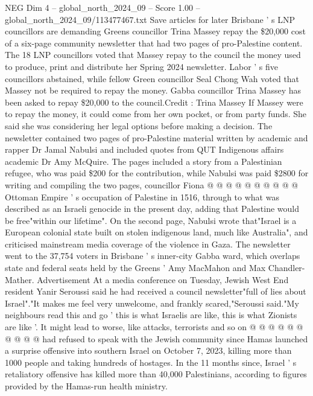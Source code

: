 \begin{textsample}{NEG Dim 4 – global\_north\_2024\_09 – Score 1.00 – global\_north\_2024\_09/113477467.txt}  \label{ex:f4_neg_146}
Save articles for later Brisbane ' s LNP councillors are demanding Greens councillor Trina Massey repay the \$20,000 cost of a six-page community newsletter that had two pages of pro-Palestine content.
The 18 LNP councillors voted that Massey repay to the council the money used to produce, print and distribute her Spring 2024 newsletter.
Labor ' s five councillors abstained, while fellow Green councillor Seal Chong Wah voted that Massey not be required to repay the money.
Gabba councillor Trina Massey has been asked to repay \$20,000 to the council.Credit : Trina Massey If Massey were to repay the money, it could come from her own pocket, or from party funds.
She said she was considering her legal options before making a decision.
The newsletter contained two pages of pro-Palestine material written by academic and rapper Dr Jamal Nabulsi and included quotes from QUT Indigenous affairs academic Dr Amy McQuire.
The pages included a story from a Palestinian refugee, who was paid \$200 for the contribution, while Nabulsi was paid \$2800 for writing and compiling the two pages, councillor Fiona @ @ @ @ @ @ @ @ @ @ Ottoman Empire ' s occupation of Palestine in 1516, through to what was described as an Israeli genocide in the present day, adding that Palestine would be free"within our lifetime".
On the second page, Nabulsi wrote that"Israel is a European colonial state built on stolen indigenous land, much like Australia", and criticised mainstream media coverage of the violence in Gaza.
The newsletter went to the 37,754 voters in Brisbane ' s inner-city Gabba ward, which overlaps state and federal seats held by the Greens ' Amy MacMahon and Max Chandler-Mather.
Advertisement At a media conference on Tuesday, Jewish West End resident Yanir Seroussi said he had received a council newsletter"full of lies about Israel"."It makes me feel very unwelcome, and frankly scared,"Seroussi said."My neighbours read this and go ' this is what Israelis are like, this is what Zionists are like '.
It might lead to worse, like attacks, terrorists and so on @ @ @ @ @ @ @ @ @ @ had refused to speak with the Jewish community since Hamas launched a surprise offensive into southern Israel on October 7, 2023, killing more than 1000 people and taking hundreds of hostages.
In the 11 months since, Israel ' s retaliatory offensive has killed more than 40,000 Palestinians, according to figures provided by the Hamas-run health ministry.

\end{textsample}
